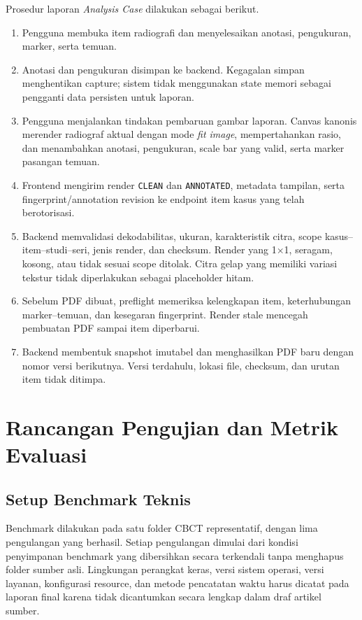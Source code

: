\documentclass[12pt,a4paper,oneside]{report}
\begin{document}
Prosedur laporan \textit{Analysis Case} dilakukan sebagai berikut.
\begin{enumerate}[label=\arabic*.]
  \item Pengguna membuka item radiografi dan menyelesaikan anotasi, pengukuran, marker, serta temuan.
  \item Anotasi dan pengukuran disimpan ke backend. Kegagalan simpan menghentikan capture; sistem tidak menggunakan state memori sebagai pengganti data persisten untuk laporan.
  \item Pengguna menjalankan tindakan pembaruan gambar laporan. Canvas kanonis merender radiograf aktual dengan mode \textit{fit image}, mempertahankan rasio, dan menambahkan anotasi, pengukuran, scale bar yang valid, serta marker pasangan temuan.
  \item Frontend mengirim render \texttt{CLEAN} dan \texttt{ANNOTATED}, metadata tampilan, serta fingerprint/annotation revision ke endpoint item kasus yang telah berotorisasi.
  \item Backend memvalidasi dekodabilitas, ukuran, karakteristik citra, scope kasus--item--studi--seri, jenis render, dan checksum. Render yang 1$\times$1, seragam, kosong, atau tidak sesuai scope ditolak. Citra gelap yang memiliki variasi tekstur tidak diperlakukan sebagai placeholder hitam.
  \item Sebelum PDF dibuat, preflight memeriksa kelengkapan item, keterhubungan marker--temuan, dan kesegaran fingerprint. Render stale mencegah pembuatan PDF sampai item diperbarui.
  \item Backend membentuk snapshot imutabel dan menghasilkan PDF baru dengan nomor versi berikutnya. Versi terdahulu, lokasi file, checksum, dan urutan item tidak ditimpa.
\end{enumerate}

\section{Rancangan Pengujian dan Metrik Evaluasi}

\subsection{Setup Benchmark Teknis}

Benchmark dilakukan pada satu folder CBCT representatif, dengan lima pengulangan yang berhasil. Setiap pengulangan dimulai dari kondisi penyimpanan benchmark yang dibersihkan secara terkendali tanpa menghapus folder sumber asli. Lingkungan perangkat keras, versi sistem operasi, versi layanan, konfigurasi resource, dan metode pencatatan waktu harus dicatat pada laporan final karena tidak dicantumkan secara lengkap dalam draf artikel sumber.
\end{document}
